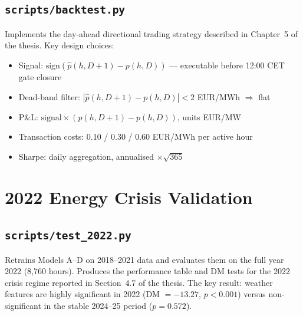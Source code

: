 \documentclass[11pt, a4paper, oneside]{report}
\begin{document}
\section{\texttt{scripts/backtest.py}}

Implements the day-ahead directional trading strategy described in
Chapter~5 of the thesis. Key design choices:
\begin{itemize}
  \item Signal: $\text{sign}(\hat{p}(h,D+1) - p(h,D))$ — executable before
        12:00 CET gate closure
  \item Dead-band filter: $|\hat{p}(h,D+1) - p(h,D)| < 2$ EUR/MWh $\Rightarrow$ flat
  \item P\&L: $\text{signal} \times (p(h,D+1) - p(h,D))$, units EUR/MW
  \item Transaction costs: 0.10 / 0.30 / 0.60 EUR/MWh per active hour
  \item Sharpe: daily aggregation, annualised $\times\sqrt{365}$
\end{itemize}



\clearpage

\chapter{2022 Energy Crisis Validation}

\section{\texttt{scripts/test\_2022.py}}

Retrains Models A--D on 2018--2021 data and evaluates them on the full
year 2022 (8,760 hours). Produces the performance table and DM tests
for the 2022 crisis regime reported in Section~4.7 of the thesis.
The key result: weather features are highly significant in 2022
(DM $= -13.27$, $p < 0.001$) versus non-significant in the stable
2024--25 period ($p = 0.572$).



\clearpage
\end{document}
